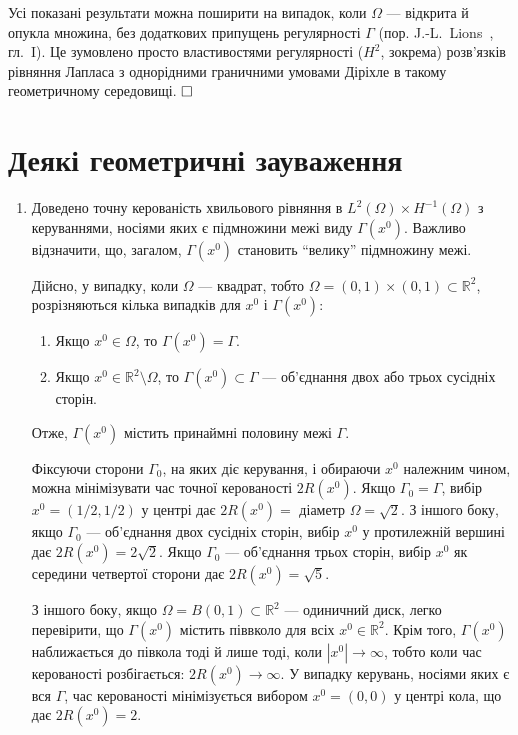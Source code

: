 \label{remark:II.2.10}
\begin{remark}
Усі показані результати можна поширити на випадок, коли $\Omega$ — відкрита й опукла множина, без додаткових припущень регулярності $\Gamma$ (пор. J.-L.~Lions~\cite{lions1988controlabilite}, гл.~I). Це зумовлено просто властивостями регулярності ($H^2$, зокрема) розв'язків рівняння Лапласа з однорідними граничними умовами Діріхле в такому геометричному середовищі.
$\hfill \square$
\end{remark}

\section{Деякі геометричні зауваження}
\label{sec:II.6}

\begin{enumerate}
\item Доведено точну керованість хвильового рівняння в $L^2(\Omega) \times H^{-1}(\Omega)$ з керуваннями, носіями яких є підмножини межі виду $\Gamma(x^0)$.
Важливо відзначити, що, загалом, $\Gamma(x^0)$ становить ``велику'' підмножину межі.

Дійсно, у випадку, коли $\Omega$ — квадрат, тобто $\Omega = (0,1) \times (0,1) \subset \mathbb{R}^2$, розрізняються кілька випадків для $x^0$ і $\Gamma(x^0)$:
\begin{enumerate}
\item Якщо $x^0 \in \Omega$, то $\Gamma(x^0) = \Gamma$.
\item Якщо $x^0 \in \mathbb{R}^2 \setminus \Omega$, то $\Gamma(x^0) \subset \Gamma$ — об'єднання двох або трьох сусідніх сторін.
\end{enumerate}
Отже, $\Gamma(x^0)$ містить принаймні половину межі $\Gamma$.

Фіксуючи сторони $\Gamma_0$, на яких діє керування, і обираючи $x^0$ належним чином, можна мінімізувати час точної керованості $2R(x^0)$. Якщо $\Gamma_0 = \Gamma$, вибір $x^0 = (1/2, 1/2)$ у центрі дає $2R(x^0) =$ діаметр $\Omega = \sqrt{2}$. З іншого боку, якщо $\Gamma_0$ — об'єднання двох сусідніх сторін, вибір $x^0$ у протилежній вершині дає $2R(x^0) = 2\sqrt{2}$. Якщо $\Gamma_0$ — об'єднання трьох сторін, вибір $x^0$ як середини четвертої сторони дає $2R(x^0) = \sqrt{5}$.

З іншого боку, якщо $\Omega = B(0,1) \subset \mathbb{R}^2$ — одиничний диск, легко перевірити, що $\Gamma(x^0)$ містить піввколо для всіх $x^0 \in \mathbb{R}^2$. Крім того, $\Gamma(x^0)$ наближається до півкола тоді й лише тоді, коли $|x^0| \to \infty$, тобто коли час керованості розбігається: $2R(x^0) \to \infty$. У випадку керувань, носіями яких є вся $\Gamma$, час керованості мінімізується вибором $x^0 = (0,0)$ у центрі кола, що дає $2R(x^0) = 2$.


\end{enumerate}
